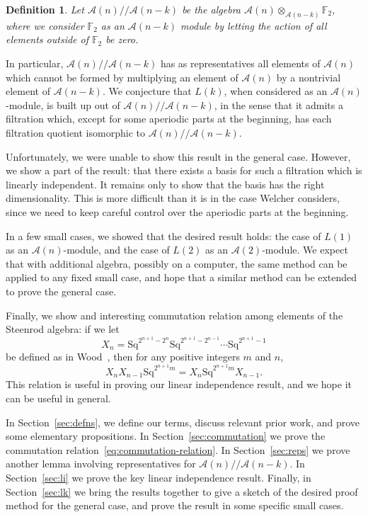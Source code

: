 \documentclass{article}
\newcommand{\A}{\mathcal{A}}
\newcommand{\F}{\mathbb{F}}
\newcommand{\Sq}{\mathrm{Sq}}
\newcommand{\mmod}{/\!/\!}
\newtheorem{defn}{Definition}
\begin{document}
\begin{defn}
  Let $\A(n)\mmod\A(n-k)$ be the algebra $\A(n)\otimes_{\A(n-k)}\F_2$, where we consider $\F_2$ as an $\A(n-k)$ module by letting the action of all elements outside of $\F_2$ be zero.
\end{defn}

In particular, $\A(n)\mmod\A(n-k)$ has as representatives all elements of $\A(n)$ which cannot be formed by multiplying an element of $\A(n)$ by a nontrivial element of $\A(n-k)$.  We conjecture that $L(k)$, when considered as an $\A(n)$-module, is built up out of $\A(n)\mmod\A(n-k)$, in the sense that it admits a filtration which, except for some aperiodic parts at the beginning, has each filtration quotient isomorphic to $\A(n)\mmod\A(n-k)$.

Unfortunately, we were unable to show this result in the general case.  However, we show a part of the result: that there exists a basis for such a filtration which is linearly independent.  It remains only to show that the basis has the right dimensionality.  This is more difficult than it is in the case Welcher considers, since we need to keep careful control over the aperiodic parts at the beginning.

In a few small cases, we showed that the desired result holds: the case of $L(1)$ as an $\A(n)$-module, and the case of $L(2)$ as an $\A(2)$-module.  We expect that with additional algebra, possibly on a computer, the same method can be applied to any fixed small case, and hope that a similar method can be extended to prove the general case.

Finally, we show and interesting commutation relation among elements of the Steenrod algebra: if we let
\[ X_n = \Sq^{2^{n+1}-2^n}\Sq^{2^{n+1}-2^{n-1}}\cdots\Sq^{2^{n+1}-1} \]
be defined as in Wood~\cite{wood}, then for any positive integers $m$ and $n$, 
\begin{equation}X_nX_{n-1}\Sq^{2^{n+1}m} = X_n\Sq^{2^{n+1}m}X_{n-1}.\label{eq:commutation-relation}\end{equation}
This relation is useful in proving our linear independence result, and we hope it can be useful in general.

In Section~\ref{sec:defns}, we define our terms, discuss relevant prior work, and prove some elementary propositions.  In Section~\ref{sec:commutation} we prove the commutation relation~\ref{eq:commutation-relation}.  In Section~\ref{sec:reps} we prove another lemma involving representatives for $\A(n)\mmod\A(n-k)$.  In Section~\ref{sec:li} we prove the key linear independence result.  Finally, in Section~\ref{sec:lk} we bring the results together to give a sketch of the desired proof method for the general case, and prove the result in some specific small cases.
\end{document}
